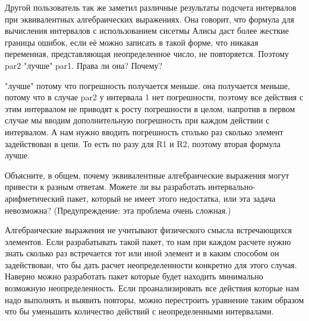 Другой пользователь так же заметил различные результаты подсчета интервалов при эквивалентных алгебраических выражениях. Она говорит, что формула для вычисления интервалов с использованием сисетмы Алисы даст более жесткие границы ошибок, если её можно записать в такой форме, что никакая переменная, представляющая неопределенное число, не повторяется. Поэтому par2 "лучше" par1. Права ли она? Почему?

"лучше" потому что погрешность получается меньше. она получается меньше, потому что в случае par2 у интервала 1 нет погрешности, поэтому все действия с этим интервалом не приводят к росту погрешности в целом, напротив в первом случае мы вводим дополнительную погрешность при каждом действии с интервалом. А нам нужно вводить погрешность столько раз сколько элемент задействован в цепи. То есть по разу для R1 и R2, поэтому вторая формула лучше.

Объясните, в общем, почему эквивалентные алгебраические выражения могут привести к разным ответам. Можете ли вы разработать интервально-арифметический пакет, который не имеет этого недостатка, или эта задача невозможна? (Предупреждение: эта проблема очень сложная.)

Алгебраические выражения не учитывают физического смысла встречающихся элементов. Если разрабатывать такой пакет, то нам при каждом расчете нужно знать сколько раз встречается тот или иной элемент и в каким способом он задействован, что бы дать расчет неопределенности конкретно для этого случая. Наверно можно разработать пакет которые будет находить минимально возможную неопределенность. Если проанализировать все действия которые нам надо выполнять и выявить повторы, можно перестроить уравнение таким образом что бы уменьшить количество действий с неопределенными интервалами.
